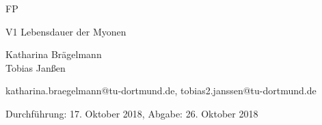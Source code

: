 
\begin{titlepage}



\begin{center} \large

  FP
  \vspace*{2cm}

  {\huge V1 Lebensdauer der Myonen}
  \vspace*{2.5cm}

  Katharina Brägelmann
  \\Tobias Janßen
  \vspace*{1.5cm}

  katharina.braegelmann@tu-dortmund.de, tobias2.janssen@tu-dortmund.de


  Durchführung: 17. Oktober 2018, Abgabe: 26. Oktober 2018
  \vspace*{4.5cm}


\end{center}
\end{titlepage}
